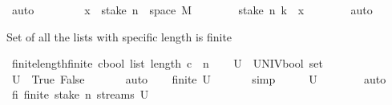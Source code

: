 \begin{isabellebody}
\ auto\isanewline
\ \ \ \ \isamarkupfalse%
\ \isamarkupfalse%
\ {\isachardoublequoteopen}\ x\ {\isasymin}\ {\isacharparenleft}{\kern0pt}stake\ n\ {\isacharbackquote}{\kern0pt}\ space\ M{\isacharparenright}{\kern0pt}{\isachardoublequoteclose}\isanewline
\ \ \ \ \ \ \isamarkupfalse%
\ {\isacartoucheopen}stake\ n\ k{}\ {\isacharequal}{\kern0pt}\ x{\isacartoucheclose}\isanewline
\ \ \ \ \ \ \isamarkupfalse%
\ auto\isanewline
\ \ \isamarkupfalse%
\isanewline
{}\isamarkupfalse%
%
\endisatagproof
{\isafoldproof}%
%
\isadelimproof
%
\endisadelimproof
%
\begin{isamarkuptext}%
Set of all the lists with specific length is finite%
\end{isamarkuptext}\isamarkuptrue%
\isamarkupfalse%
\ finite{\isacharunderscore}{\kern0pt}length{\isacharcolon}{\kern0pt}{\isachardoublequoteopen}finite\ {\isacharbraceleft}{\kern0pt}c{\isacharcolon}{\kern0pt}{\isacharcolon}{\kern0pt}bool\ list{\isachardot}{\kern0pt}\ length\ c\ {\isacharequal}{\kern0pt}\ n{\isacharbraceright}{\kern0pt}{\isachardoublequoteclose}\isanewline
%
\isadelimproof
%
\endisadelimproof
%
\isatagproof
{}\isamarkupfalse%
{\isacharminus}{\kern0pt}\isanewline
\ \ \isamarkupfalse%
\ {\isacharquery}{\kern0pt}U\ {\isacharequal}{\kern0pt}\ {\isachardoublequoteopen}UNIV{\isacharcolon}{\kern0pt}{\isacharcolon}{\kern0pt}bool\ set{\isachardoublequoteclose}\isanewline
\ \ \isamarkupfalse%
\ {\isachardoublequoteopen}{\isacharquery}{\kern0pt}U\ {\isacharequal}{\kern0pt}\ {\isacharbraceleft}{\kern0pt}True{\isacharcomma}{\kern0pt}\ False{\isacharbraceright}{\kern0pt}{\isachardoublequoteclose}\ \isanewline
\ \ \ \ \isamarkupfalse%
\ auto\isanewline
\ \ \isamarkupfalse%
\ {\isachardoublequoteopen}finite\ {\isacharquery}{\kern0pt}U{\isachardoublequoteclose}\ \isanewline
\ \ \ \ \isamarkupfalse%
\ simp\isanewline
\ \ \isamarkupfalse%
\ \isamarkupfalse%
\ {\isachardoublequoteopen}{\isacharquery}{\kern0pt}U\ {\isasymnoteq}\ {\isacharbraceleft}{\kern0pt}{\isacharbraceright}{\kern0pt}{\isachardoublequoteclose}\isanewline
\ \ \ \ \isamarkupfalse%
\ auto\isanewline
\ \ \isamarkupfalse%
\ \isamarkupfalse%
\ fi{\isacharcolon}{\kern0pt}\ {\isachardoublequoteopen}finite\ {\isacharparenleft}{\kern0pt}stake\ n\ {\isacharbackquote}{\kern0pt}streams\ {\isacharquery}{\kern0pt}U{\isacharparenright}{\kern0pt}{\isachardoublequoteclose}\ \isanewline

\end{isabellebody}
